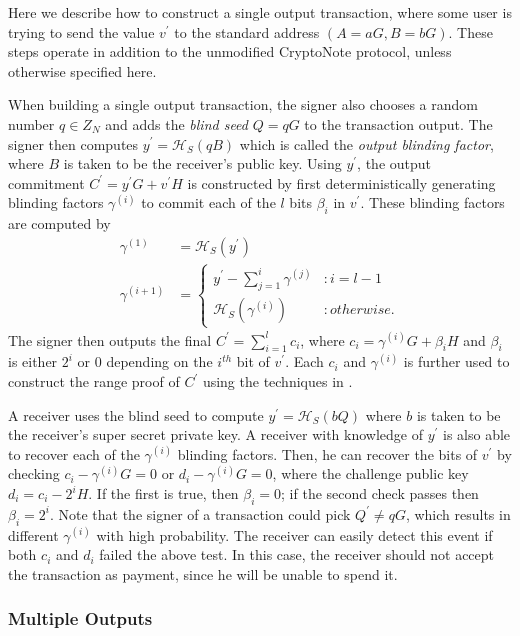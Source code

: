 \documentclass{article}
\newcommand{\oy}{\ensuremath{y^\prime}}
\newcommand{\oC}{\ensuremath{C^\prime}}
\newcommand{\ov}{\ensuremath{v^\prime}}
\newcommand{\hs}{\ensuremath{\mathcal{H}_S}}
\begin{document}
Here we describe how to construct a single output transaction, where some user
is trying to send the value {\ov} to the standard address $(A=aG, B=bG)$.  These
steps operate in addition to the unmodified CryptoNote protocol, unless
otherwise specified here.

When building a single output transaction, the signer also chooses a random
number $q \in Z_N$ and adds the {\em blind seed} $Q=qG$ to the transaction
output.  The signer then computes $\oy = \hs(qB)$ which is called the {\em
output blinding factor}, where $B$ is taken to be the receiver's public key.
Using $\oy$, the output commitment $\oC = \oy G + \ov H$ is constructed by first
deterministically generating blinding factors $\gamma^{(i)}$ to commit each of
the $l$ bits $\beta_i$ in {\ov}.  These blinding factors are computed by
\begin{align*}
  \gamma^{(1)} &= \hs(\oy) \\
  \gamma^{(i+1)} &= 
    \begin{cases}
      \oy - \sum_{j=1}^{i} \gamma^{(j)} &: i=l-1 \\
      \hs(\gamma^{(i)}) &: otherwise.
    \end{cases}
\end{align*}
The signer then outputs the final $\oC = \sum_{i=1}^l c_i$, where $c_i =
\gamma^{(i)} G + \beta_i H$ and $\beta_i$ is either $2^i$ or 0 depending on the
$i^{th}$ bit of {\ov}.  Each $c_i$ and $\gamma^{(i)}$ is further used to
construct the range proof of $\oC$ using the techniques in \cite{MP15}.

A receiver uses the blind seed to compute $\oy = \hs(bQ)$ where $b$ is taken to
be the receiver's super secret private key.  A receiver with knowledge of $\oy$
is also able to recover each of the $\gamma^{(i)}$ blinding factors.  Then, he
can recover the bits of {\ov} by checking $c_i - \gamma^{(i)} G = 0$ or $d_i -
\gamma^{(i)} G = 0$, where the challenge public key $d_i = c_i - 2^i H$.  If the
first is true, then $\beta_i=0$; if the second check passes then $\beta_i=2^i$.
Note that the signer of a transaction could pick $Q^\prime \neq qG$, which
results in different $\gamma^{(i)}$ with high probability.  The receiver can
easily detect this event if both $c_i$ and $d_i$ failed the above test.  In this
case, the receiver should not accept the transaction as payment, since he will
be unable to spend it.

\subsubsection{Multiple Outputs}
\end{document}
